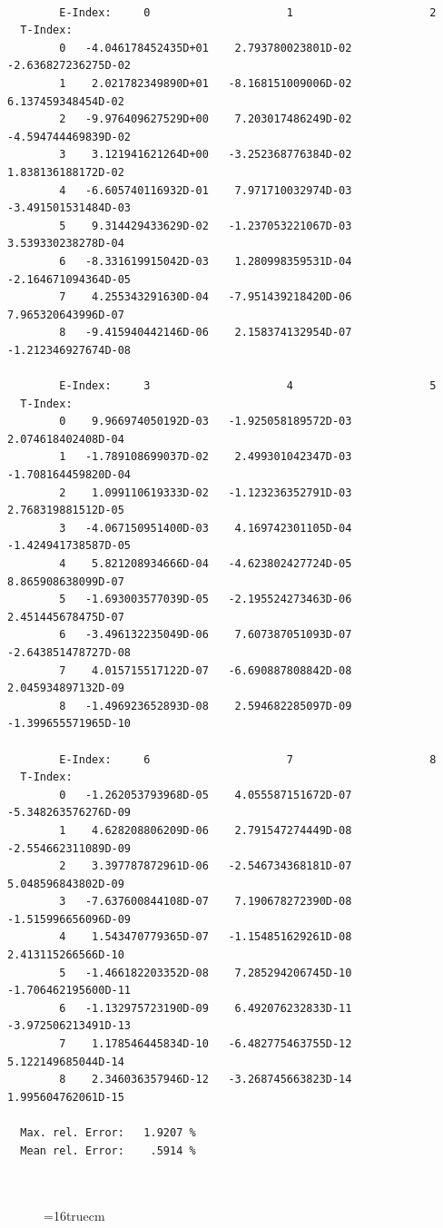 \documentclass[12pt,dvips]{article}
\begin{document}
\begin{small}\begin{verbatim}

        E-Index:     0                     1                     2
  T-Index:
        0   -4.046178452435D+01    2.793780023801D-02   -2.636827236275D-02
        1    2.021782349890D+01   -8.168151009006D-02    6.137459348454D-02
        2   -9.976409627529D+00    7.203017486249D-02   -4.594744469839D-02
        3    3.121941621264D+00   -3.252368776384D-02    1.838136188172D-02
        4   -6.605740116932D-01    7.971710032974D-03   -3.491501531484D-03
        5    9.314429433629D-02   -1.237053221067D-03    3.539330238278D-04
        6   -8.331619915042D-03    1.280998359531D-04   -2.164671094364D-05
        7    4.255343291630D-04   -7.951439218420D-06    7.965320643996D-07
        8   -9.415940442146D-06    2.158374132954D-07   -1.212346927674D-08

        E-Index:     3                     4                     5
  T-Index:
        0    9.966974050192D-03   -1.925058189572D-03    2.074618402408D-04
        1   -1.789108699037D-02    2.499301042347D-03   -1.708164459820D-04
        2    1.099110619333D-02   -1.123236352791D-03    2.768319881512D-05
        3   -4.067150951400D-03    4.169742301105D-04   -1.424941738587D-05
        4    5.821208934666D-04   -4.623802427724D-05    8.865908638099D-07
        5   -1.693003577039D-05   -2.195524273463D-06    2.451445678475D-07
        6   -3.496132235049D-06    7.607387051093D-07   -2.643851478727D-08
        7    4.015715517122D-07   -6.690887808842D-08    2.045934897132D-09
        8   -1.496923652893D-08    2.594682285097D-09   -1.399655571965D-10

        E-Index:     6                     7                     8
  T-Index:
        0   -1.262053793968D-05    4.055587151672D-07   -5.348263576276D-09
        1    4.628208806209D-06    2.791547274449D-08   -2.554662311089D-09
        2    3.397787872961D-06   -2.546734368181D-07    5.048596843802D-09
        3   -7.637600844108D-07    7.190678272390D-08   -1.515996656096D-09
        4    1.543470779365D-07   -1.154851629261D-08    2.413115266566D-10
        5   -1.466182203352D-08    7.285294206745D-10   -1.706462195600D-11
        6   -1.132975723190D-09    6.492076232833D-11   -3.972506213491D-13
        7    1.178546445834D-10   -6.482775463755D-12    5.122149685044D-14
        8    2.346036357946D-12   -3.268745663823D-14    1.995604762061D-15

  Max. rel. Error:   1.9207 %
  Mean rel. Error:    .5914 %



\end{verbatim}\end{small}
\begin{figure} \label{2.3.9c}
\epsfxsize=16truecm
\end{figure}
\newpage
\end{document}

